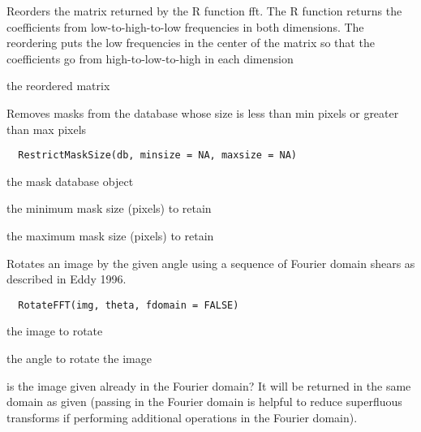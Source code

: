 \documentclass[a4paper]{book}
\begin{document}
%
\begin{Details}\relax
Reorders the matrix returned by the R function fft.  The
R function returns the coefficients from
low-to-high-to-low frequencies in both dimensions.  The
reordering puts the low frequencies in the center of the
matrix so that the coefficients go from
high-to-low-to-high in each dimension
\end{Details}
%
\begin{Value}
the reordered matrix
\end{Value}
%
\begin{Description}\relax
Removes masks from the database whose size is less than
min pixels or greater than max pixels
\end{Description}
%
\begin{Usage}
\begin{verbatim}
  RestrictMaskSize(db, minsize = NA, maxsize = NA)
\end{verbatim}
\end{Usage}
%
\begin{Arguments}
\begin{ldescription}
\item[\code{db}] the mask database object

\item[\code{min}] the minimum mask size (pixels) to retain

\item[\code{max}] the maximum mask size (pixels) to retain
\end{ldescription}
\end{Arguments}
%
\begin{Description}\relax
Rotates an image by the given angle using a sequence of
Fourier domain shears as described in Eddy 1996.
\end{Description}
%
\begin{Usage}
\begin{verbatim}
  RotateFFT(img, theta, fdomain = FALSE)
\end{verbatim}
\end{Usage}
%
\begin{Arguments}
\begin{ldescription}
\item[\code{img}] the image to rotate

\item[\code{theta}] the angle to rotate the image

\item[\code{fdomain}] is the image given already in the Fourier
domain?  It will be returned in the same domain as given
(passing in the Fourier domain is helpful to reduce
superfluous transforms if performing additional
operations in the Fourier domain).
\end{ldescription}
\end{Arguments}
\end{document}
